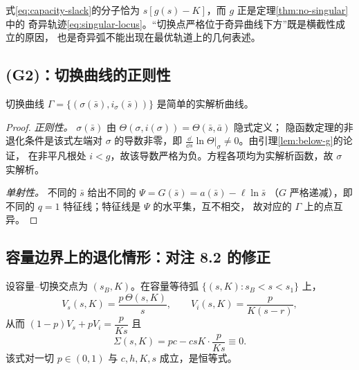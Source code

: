 \begin{remark}
式\eqref{eq:capacity-slack}的分子恰为 $s[g(s)-K]$，而 $g$ 正是定理\ref{thm:no-singular}中的
奇异轨迹\eqref{eq:singular-locus}。“切换点严格位于奇异曲线下方”既是横截性成立的原因，
也是奇异弧不能出现在最优轨道上的几何表述。
\end{remark}

\subsection{(G2)：切换曲线的正则性}

\begin{proposition}
\label{prop:Gamma-C1}
切换曲线 $\Gamma=\{(\sigma(\bar s),i_\sigma(\bar s))\}$ 是简单的实解析曲线。
\end{proposition}

\begin{proof}
\emph{正则性。} $\sigma(\bar s)$ 由 $\Theta(\sigma,i(\sigma))=\Theta(\bar s,\bar a)$ 隐式定义；
隐函数定理的非退化条件是该式左端对 $\sigma$ 的导数非零，即
$\frac{\dd}{\dd s}\ln\Theta\big|_\sigma\ne0$。由引理\ref{lem:below-g}的论证，
在非平凡根处 $i<g$，故该导数严格为负。方程各项均为实解析函数，故 $\sigma$ 实解析。

\emph{单射性。} 不同的 $\bar s$ 给出不同的 $\Psi=G(\bar s)=a(\bar s)-\ell\ln\bar s$
（$G$ 严格递减），即不同的 $q=1$ 特征线；特征线是 $\Psi$ 的水平集，互不相交，
故对应的 $\Gamma$ 上的点互异。
\end{proof}

\subsection{容量边界上的退化情形：对注 8.2 的修正}
\label{sec:boundary-correction}

\begin{proposition}[容量等待弧上切换函数恒为零]
\label{prop:sigma-zero-boundary}
设容量--切换交点为 $(s_B,K)$。在容量等待弧 $\{(s,K):s_B<s<s_1\}$ 上，
\begin{equation}
V_s(s,K)=\frac{p\,\Theta(s,K)}{s},\qquad
V_i(s,K)=\frac{p}{K(s-r)},
\label{eq:V-grad-boundary}
\end{equation}
从而 $(1-p)V_s+pV_i=\dfrac{p}{Ks}$ 且
\begin{equation}
\Sigma(s,K)=pc-csK\cdot\frac{p}{Ks}\equiv0 .
\label{eq:sigma-zero}
\end{equation}
该式对一切 $p\in(0,1)$ 与 $c,h,K,s$ 成立，是恒等式。
\end{proposition}

